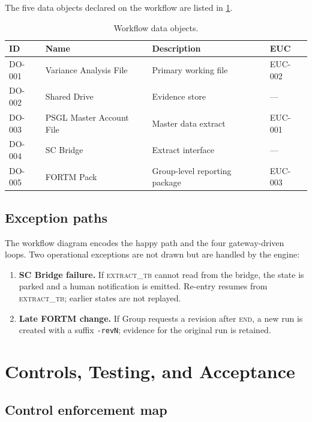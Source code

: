 \documentclass[11pt,a4paper,twoside]{report}
\newcommand{\stateid}[1]{\textsc{\lowercase{#1}}}
\begin{document}
The five data objects declared on the workflow are listed in
\cref{tab:dataobjects}.

\begin{table}[htbp]
\caption{Workflow data objects.}\label{tab:dataobjects}
\centering
\small
\begin{tabularx}{\linewidth}{@{}llXl@{}}
\toprule
\textbf{ID} & \textbf{Name} & \textbf{Description} & \textbf{EUC} \\ \midrule
DO-001 & Variance Analysis File   & Primary working file              & EUC-002 \\
DO-002 & Shared Drive             & Evidence store                    & ---     \\
DO-003 & PSGL Master Account File & Master data extract               & EUC-001 \\
DO-004 & SC Bridge                & Extract interface                 & ---     \\
DO-005 & FORTM Pack               & Group-level reporting package     & EUC-003 \\
\bottomrule
\end{tabularx}
\end{table}

\section{Exception paths}

The workflow diagram encodes the happy path and the four
gateway-driven loops. Two operational exceptions are not drawn but
are handled by the engine:

\begin{enumerate}
\item \textbf{SC Bridge failure.} If \stateid{EXTRACT\_TB} cannot
read from the bridge, the state is parked and a human
notification is emitted. Re-entry resumes from
\stateid{EXTRACT\_TB}; earlier states are not replayed.
\item \textbf{Late FORTM change.} If Group requests a revision after
\stateid{END}, a new run is created with a suffix
\texttt{-revN}; evidence for the original run is retained.
\end{enumerate}
\chapter{Controls, Testing, and Acceptance}\label{ch:controls}

\section{Control enforcement map}
\end{document}
